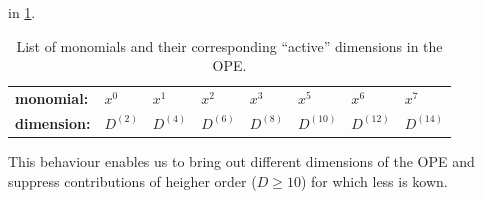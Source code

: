 \documentclass[../../index.tex]{subfiles}
\begin{document}
in \cref{table:monomialDimensions}.
\begin{table}
  \centering
  \begin{tabular}{l|lllllll}
    \toprule
    \textbf{monomial:} & $x^0$ & $x^1$ & $x^2$ & $x^3$ & $x^5$ & $x^6$ & $x^7$\\
    \textbf{dimension:} & $D^{(2)}$ & $D^{(4)}$ & $D^{(6)}$ & $D^{(8)}$ & $D^{(10)}$ & $D^{(12)}$ & $D^{(14)}$\\
    \bottomrule 
  \end{tabular}
  \caption{List of monomials and their corresponding ``active'' dimensions in the OPE.}
  \label{table:monomialDimensions}
\end{table}
This behaviour enables us to bring out different dimensions of the OPE and
suppress contributions of heigher order ($D\geq10$) for which less is kown. 
\end{document}
